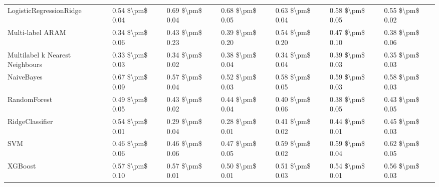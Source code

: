 \begin{tabular}{lllllll}
        LogisticRegressionRidge &     0.54 \$\textbackslash pm\$ 0.04 &           0.69 \$\textbackslash pm\$ 0.04 &       0.68 \$\textbackslash pm\$ 0.05 &        0.63 \$\textbackslash pm\$ 0.04 &                         0.58 \$\textbackslash pm\$ 0.05 & 0.55 \$\textbackslash pm\$ 0.02 \\
               Multi-label ARAM &     0.34 \$\textbackslash pm\$ 0.06 &           0.43 \$\textbackslash pm\$ 0.23 &       0.39 \$\textbackslash pm\$ 0.20 &        0.54 \$\textbackslash pm\$ 0.20 &                         0.47 \$\textbackslash pm\$ 0.10 & 0.38 \$\textbackslash pm\$ 0.06 \\
Multilabel k Nearest Neighbours &     0.33 \$\textbackslash pm\$ 0.03 &           0.34 \$\textbackslash pm\$ 0.02 &       0.38 \$\textbackslash pm\$ 0.04 &        0.34 \$\textbackslash pm\$ 0.04 &                         0.39 \$\textbackslash pm\$ 0.03 & 0.35 \$\textbackslash pm\$ 0.03 \\
                     NaiveBayes &     0.67 \$\textbackslash pm\$ 0.09 &           0.57 \$\textbackslash pm\$ 0.04 &       0.52 \$\textbackslash pm\$ 0.03 &        0.58 \$\textbackslash pm\$ 0.05 &                         0.59 \$\textbackslash pm\$ 0.03 & 0.58 \$\textbackslash pm\$ 0.03 \\
                   RandomForest &     0.49 \$\textbackslash pm\$ 0.05 &           0.43 \$\textbackslash pm\$ 0.02 &       0.44 \$\textbackslash pm\$ 0.04 &        0.40 \$\textbackslash pm\$ 0.06 &                         0.38 \$\textbackslash pm\$ 0.05 & 0.43 \$\textbackslash pm\$ 0.05 \\
                RidgeClassifier &     0.54 \$\textbackslash pm\$ 0.01 &           0.29 \$\textbackslash pm\$ 0.04 &       0.28 \$\textbackslash pm\$ 0.01 &        0.41 \$\textbackslash pm\$ 0.02 &                         0.44 \$\textbackslash pm\$ 0.01 & 0.45 \$\textbackslash pm\$ 0.03 \\
                            SVM &     0.46 \$\textbackslash pm\$ 0.06 &           0.46 \$\textbackslash pm\$ 0.06 &       0.47 \$\textbackslash pm\$ 0.05 &        0.59 \$\textbackslash pm\$ 0.02 &                         0.59 \$\textbackslash pm\$ 0.04 & 0.62 \$\textbackslash pm\$ 0.05 \\
                        XGBoost &     0.57 \$\textbackslash pm\$ 0.10 &           0.57 \$\textbackslash pm\$ 0.01 &       0.50 \$\textbackslash pm\$ 0.01 &        0.51 \$\textbackslash pm\$ 0.03 &                         0.54 \$\textbackslash pm\$ 0.01 & 0.56 \$\textbackslash pm\$ 0.03 \\
\bottomrule
\end{tabular}
